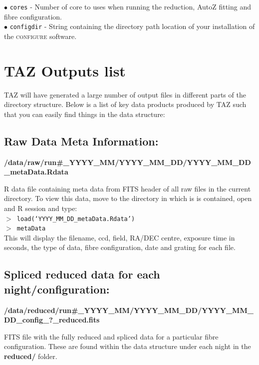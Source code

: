 \documentclass[12pt]{article}
\begin{document}
$\bullet$ \texttt{cores} - Number of core to uses when running the reduction, AutoZ fitting and fibre configuration. \\

$\bullet$ \texttt{configdir} - String containing the directory path location of your installation of the \textsc{configure} software. 



\section{TAZ Outputs list}

TAZ will have generated a large number of output files in different parts of the directory structure. Below is a list of key data products produced by TAZ such that you can easily find things in the data structure: 

\subsection{Raw Data Meta Information:}

\textbf{/data/raw/run\#\_YYYY\_MM/YYYY\_MM\_DD/YYYY\_MM\_DD\_metaData.Rdata} 

R data file containing meta data from FITS header of all raw files in the current directory. To view this data, move to the directory in which is is contained, open and R session and type: \\

\hspace{10mm}  \texttt{$>$ load(`YYYY\_MM\_DD\_metaData.Rdata')}\\

\hspace{10mm}  \texttt{$>$ metaData}\\
  
 
 This will display the filename, ccd, field, RA/DEC centre, exposure time in seconds, the type of data, fibre configuration, date and grating for each file.  

 
\subsection{Spliced reduced data for each night/configuration:} 
 
 \textbf{/data/reduced/run\#\_YYYY\_MM/YYYY\_MM\_DD/YYYY\_MM\_DD\_config\_?\_reduced.fits} 
 
 FITS file with the fully reduced and spliced data for a particular fibre configuration. These are found within the data structure under each night in the \textbf{reduced/} folder. 
\end{document}
